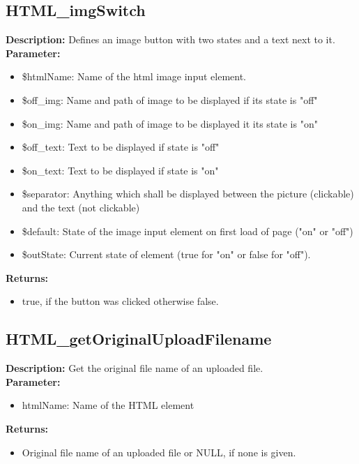\subsection{HTML\_imgSwitch}
\textbf{Description:} Defines an image button with two states and a text next to it.\\
\textbf{Parameter:}
\begin{itemize}
\item \$htmlName: Name of the html image input element.
\item \$off\_img: Name and path of image to be displayed if its state is "off"
\item \$on\_img: Name and path of image to be displayed it its state is "on"
\item \$off\_text: Text to be displayed if state is "off"
\item \$on\_text: Text to be displayed if state is "on"
\item \$separator: Anything which shall be displayed between the picture (clickable) and the text (not clickable)
\item \$default: State of the image input element on first load of page ("on" or "off")
\item \$outState: Current state of element (true for "on" or false for "off").
\end{itemize}
\textbf{Returns:}
\begin{itemize}
\item true, if the button was clicked otherwise false.
\end{itemize}

\subsection{HTML\_getOriginalUploadFilename}
\textbf{Description:} Get the original file name of an uploaded file.\\
\textbf{Parameter:}
\begin{itemize}
\item htmlName: Name of the HTML element
\end{itemize}
\textbf{Returns:}
\begin{itemize}
\item Original file name of an uploaded file or NULL, if none is given.
\end{itemize}

